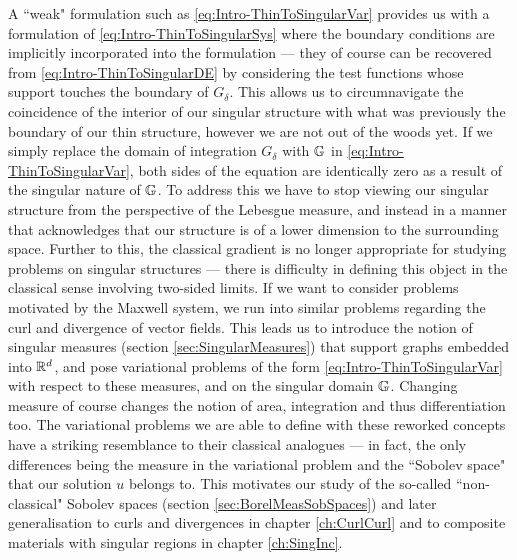 A ``weak" formulation such as \eqref{eq:Intro-ThinToSingularVar} provides us with a formulation of \eqref{eq:Intro-ThinToSingularSys} where the boundary conditions are implicitly incorporated into the formulation --- they of course can be recovered from \eqref{eq:Intro-ThinToSingularDE} by considering the test functions whose support touches the boundary of $G_{\delta}$.
This allows us to circumnavigate the coincidence of the interior of our singular structure with what was previously the boundary of our thin structure, however we are not out of the woods yet.
If we simply replace the domain of integration $G_{\delta}$ with $\mathbb{G}$ in \eqref{eq:Intro-ThinToSingularVar}, both sides of the equation are identically zero as a result of the singular nature of  $\mathbb{G}$.
To address this we have to stop viewing our singular structure from the perspective of the Lebesgue measure, and instead in a manner that acknowledges that our structure is of a lower dimension to the surrounding space.
Further to this, the classical gradient is no longer appropriate for studying problems on singular structures --- there is difficulty in defining this object in the classical sense involving two-sided limits.
If we want to consider problems motivated by the Maxwell system, we run into similar problems regarding the curl and divergence of vector fields.
This leads us to introduce the notion of singular measures (section \ref{sec:SingularMeasures}) that support graphs embedded into $\mathbb{R}^d$, and pose variational problems of the form \eqref{eq:Intro-ThinToSingularVar} with respect to these measures, and on the singular domain $\mathbb{G}$.
Changing measure of course changes the notion of area, integration and thus differentiation too.
The variational problems we are able to define with these reworked concepts have a striking resemblance to their classical analogues --- in fact, the only differences being the measure in the variational problem and the ``Sobolev space" that our solution $u$ belongs to.
This motivates our study of the so-called ``non-classical" Sobolev spaces (section \ref{sec:BorelMeasSobSpaces}) and later generalisation to curls and divergences in chapter \ref{ch:CurlCurl} and to composite materials with singular regions in chapter \ref{ch:SingInc}.

